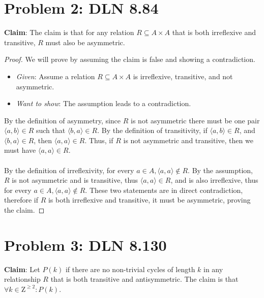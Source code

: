 \documentclass[titlepage]{article}
\begin{document}
\section{Problem 2: DLN 8.84}

\textbf{Claim}: The claim is that for any relation $R \subseteq A \times A$ that is both irreflexive and transitive, $R$ must also be asymmetric. 

\begin{proof}
We will prove by assuming the claim is false and showing a contradiction.

\begin{itemize}
\item \emph{Given}: Assume a relation $R \subseteq A \times A$ is irreflexive, transitive, and not asymmetric.  
\item \emph{Want to show}: The assumption leads to a contradiction.
\end{itemize}
By the definition of asymmetry, since $R$ is not asymmetric there must be one pair $\langle a,b\rangle \in R$ such that $\langle b,a\rangle \in R$. By the definition of transitivity, if $\langle a,b \rangle \in R$, and $\langle b,a\rangle \in R$, then $\langle a,a\rangle \in R$. Thus, if $R$ is not asymmetric and transitive, then we must have $\langle a,a \rangle \in R$.
\\
\\
By the definition of irreflexivity, for every $a \in A, \langle a,a\rangle \notin R$. By the assumption, $R$ is not asymmetric and is transitive, thus $\langle a,a \rangle \in R$, and is also irreflexive, thus for every $a \in A, \langle a,a\rangle \notin R$. These two statements are in direct contradiction, therefore if $R$ is both irreflexive and transitive, it must be asymmetric, proving the claim.


\end{proof}

\section{Problem 3: DLN 8.130}

\textbf{Claim}: Let $P(k)$ if there are no non-trivial cycles of length $k$ in any relationship $R$ that is both transitive and antisymmetric. The claim is that $\forall k \in \mathrm{Z}^{\geq 2}: P(k)$. 
\end{document}
